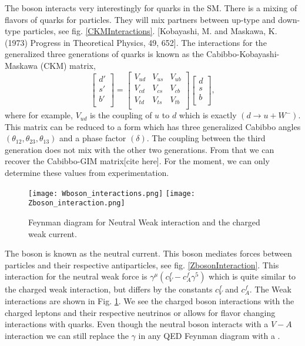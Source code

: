 The \W{} boson interacts very interestingly for quarks in the SM. There is a mixing of flavors of quarks for particles. They will mix partners between up-type and down-type particles, see fig. \ref{CKMInteractions}. [Kobayashi, M. and Maskawa, K. (1973) Progress in Theoretical Physics, 49, 652]. The interactions for the generalized three generations of quarks is known as the Cabibbo-Kobayashi-Maskawa (CKM) matrix,
\begin{equation}\label{CKM}
\begin{bmatrix}
d' \\
s' \\
b' \\
\end{bmatrix} =
\begin{bmatrix}
V_{ud} & V_{us} & V_{ub} \\
V_{cd} & V_{cs} & V_{cb} \\
V_{td} & V_{ts} & V_{tb} \\
\end{bmatrix}
\begin{bmatrix}
d \\
s \\
b \\
\end{bmatrix},
\end{equation}
where for example, $V_{ud}$ is the coupling of $u$ to $d$ which is exactly $(d\rightarrow u+W^-)$. This matrix can be reduced to a form which has three generalized Cabibbo angles $(\theta_{12},\theta_{23},\theta_{13})$ and a phase factor $(\delta)$. The coupling between the third generation does not mix with the other two generations. From that we can recover the Cabibbo-GIM matrix[cite here]. For the moment, we can only determine these values from experimentation. 

\begin{figure}[!htb]
	  \texttt{[image: Wboson\_interactions.png]}
	\endminipage\hfill
	  \texttt{[image: Zboson\_interaction.png]}
	\endminipage\hfill
	\caption[Weak Feynman Diagrams]{Feynman diagram for Neutral Weak interaction and the charged weak current.}
 	\label{WeakRules} 
\end{figure}

The \Z{} boson is known as the neutral current. This boson mediates forces between particles and their respective antiparticles, see fig. \ref{ZbosonInteraction}. This interaction for the neutral weak force is $\gamma^\mu(c_V^f-c_A^f\gamma^5)$ which is quite similar to the charged weak interaction, but differs by the constants $c_V^f$ and $c_A^f$. The Weak interactions are shown in Fig. \ref{WeakRules}. We see the charged \W{} boson interactions with the charged leptons and their respective neutrinos or allows for flavor changing interactions with quarks. Even though the neutral \Z{} boson interacts with a $V-A$ interaction we can still replace the $\gamma$ in any QED Feynman diagram with a \Z{}.

